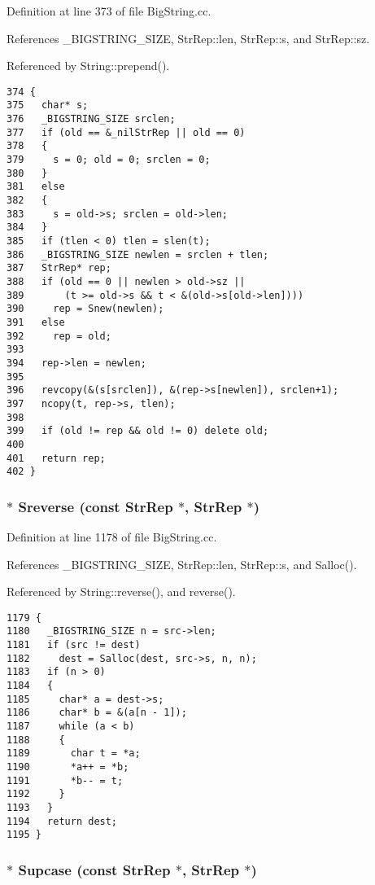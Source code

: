 Definition at line 373 of file Big\-String.cc.

References \_\-BIGSTRING\_\-SIZE, Str\-Rep::len, Str\-Rep::s, and Str\-Rep::sz.

Referenced by String::prepend().



\footnotesize\begin{verbatim}374 {
375   char* s;
376   _BIGSTRING_SIZE srclen;
377   if (old == &_nilStrRep || old == 0)
378   {
379     s = 0; old = 0; srclen = 0;
380   }
381   else
382   {
383     s = old->s; srclen = old->len;
384   }
385   if (tlen < 0) tlen = slen(t);
386   _BIGSTRING_SIZE newlen = srclen + tlen;
387   StrRep* rep;
388   if (old == 0 || newlen > old->sz || 
389       (t >= old->s && t < &(old->s[old->len])))
390     rep = Snew(newlen);
391   else
392     rep = old;
393 
394   rep->len = newlen;
395 
396   revcopy(&(s[srclen]), &(rep->s[newlen]), srclen+1);
397   ncopy(t, rep->s, tlen);
398 
399   if (old != rep && old != 0) delete old;
400 
401   return rep;
402 }
\end{verbatim}\normalsize 
{}
\subsubsection{$\ast$ Sreverse (const {\bf Str\-Rep} $\ast$, {\bf Str\-Rep} $\ast$)}\label{BigString_8hh_a21}




Definition at line 1178 of file Big\-String.cc.

References \_\-BIGSTRING\_\-SIZE, Str\-Rep::len, Str\-Rep::s, and Salloc().

Referenced by String::reverse(), and reverse().



\footnotesize\begin{verbatim}1179 {
1180   _BIGSTRING_SIZE n = src->len;
1181   if (src != dest)
1182     dest = Salloc(dest, src->s, n, n);
1183   if (n > 0)
1184   {
1185     char* a = dest->s;
1186     char* b = &(a[n - 1]);
1187     while (a < b)
1188     {
1189       char t = *a;
1190       *a++ = *b;
1191       *b-- = t;
1192     }
1193   }
1194   return dest;
1195 }
\end{verbatim}\normalsize 
{}
\subsubsection{$\ast$ Supcase (const {\bf Str\-Rep} $\ast$, {\bf Str\-Rep} $\ast$)}\label{BigString_8hh_a22}




